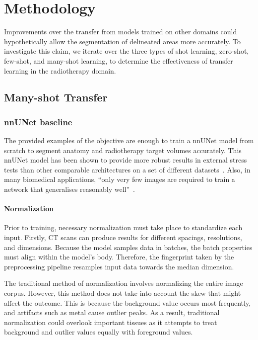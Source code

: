 \documentclass[12pt,twoside]{report}
\begin{document}
\chapter{Methodology}\label{sect:methodology}

Improvements over the transfer from models trained on other domains could hypothetically allow the segmentation of delineated areas more accurately. To investigate this claim, we iterate over the three types of shot learning, zero-shot, few-shot, and many-shot learning, to determine the effectiveness of transfer learning in the radiotherapy domain.

\section{Many-shot Transfer}

\subsection{nnUNet baseline}

The provided examples of the objective are enough to train a nnUNet model from scratch to segment anatomy and radiotherapy target volumes accurately. This nnUNet model has been shown to provide more robust results in external stress tests than other comparable architectures on a set of different datasets~\cite{isensee2024nnunet}. Also, in many biomedical applications, ``only very few images are required to train a network that generalises reasonably well''~\cite{DBLP:journals/corr/CicekALBR16}.

\subsubsection{Normalization}

Prior to training, necessary normalization must take place to standardize each input. Firstly, CT scans can produce results for different spacings, resolutions, and dimensions. Because the model samples data in batches, the batch properties must align within the model's body. Therefore, the fingerprint taken by the preprocessing pipeline resamples input data towards the median dimension. 

The traditional method of normalization involves normalizing the entire image corpus. However, this method does not take into account the skew that might affect the outcome. This is because the background value occurs most frequently, and artifacts such as metal cause outlier peaks. As a result, traditional normalization could overlook important tissues as it attempts to treat background and outlier values equally with foreground values.
\end{document}
